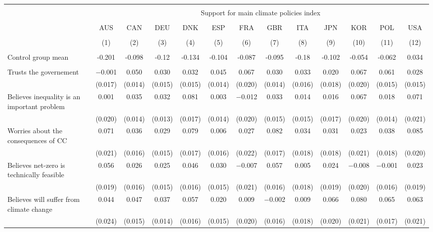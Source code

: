 
\begin{tabular}{@{\extracolsep{5pt}}lcccccccccccc} 
\\[-1.8ex]\hline 
\hline \\[-1.8ex] 
 & \multicolumn{12}{c}{Support for main climate policies index} \\ 
\cline{2-13} 
\\[-1.8ex] & AUS & CAN & DEU & DNK & ESP & FRA & GBR & ITA & JPN & KOR & POL & USA \\ 
\\[-1.8ex] & (1) & (2) & (3) & (4) & (5) & (6) & (7) & (8) & (9) & (10) & (11) & (12)\\ 
\hline \\[-1.8ex] 
Control group mean & -0.201 & -0.098 & -0.12 & -0.134 & -0.104 & -0.087 & -0.095 & -0.18 & -0.102 & -0.054 & -0.062 & 0.034  \\ \hline \\[-1.8ex]
 Trusts the governement & $-$0.001 & 0.050 & 0.030 & 0.032 & 0.045 & 0.067 & 0.030 & 0.033 & 0.020 & 0.067 & 0.061 & 0.028 \\ 
  & (0.017) & (0.014) & (0.015) & (0.015) & (0.014) & (0.020) & (0.014) & (0.016) & (0.018) & (0.020) & (0.015) & (0.015) \\ 
  Believes inequality is an important problem & 0.001 & 0.035 & 0.032 & 0.081 & 0.003 & $-$0.012 & 0.033 & 0.014 & 0.016 & 0.067 & 0.018 & 0.071 \\ 
  & (0.020) & (0.014) & (0.013) & (0.017) & (0.014) & (0.020) & (0.015) & (0.015) & (0.017) & (0.020) & (0.014) & (0.021) \\ 
  Worries about the consequences of CC & 0.071 & 0.036 & 0.029 & 0.079 & 0.006 & 0.027 & 0.082 & 0.034 & 0.031 & 0.023 & 0.038 & 0.085 \\ 
  & (0.021) & (0.016) & (0.015) & (0.017) & (0.016) & (0.022) & (0.017) & (0.018) & (0.018) & (0.021) & (0.018) & (0.020) \\ 
  Believes net-zero is technically feasible & 0.056 & 0.026 & 0.025 & 0.046 & 0.030 & $-$0.007 & 0.057 & 0.005 & 0.024 & $-$0.008 & $-$0.001 & 0.023 \\ 
  & (0.019) & (0.016) & (0.015) & (0.016) & (0.015) & (0.021) & (0.016) & (0.018) & (0.019) & (0.020) & (0.016) & (0.019) \\ 
  Believes will suffer from climate change & 0.044 & 0.047 & 0.037 & 0.057 & 0.020 & 0.009 & $-$0.002 & 0.009 & 0.066 & 0.080 & 0.065 & 0.063 \\ 
  & (0.024) & (0.015) & (0.014) & (0.016) & (0.015) & (0.020) & (0.016) & (0.018) & (0.020) & (0.021) & (0.017) & (0.021) \\ 

\end{tabular}
